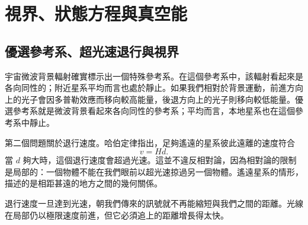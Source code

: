 \chapter{視界、狀態方程與真空能}

\section{優選參考系、超光速退行與視界}

宇宙微波背景輻射確實標示出一個特殊參考系。在這個參考系中，該輻射看起來是各向同性的；附近星系平均而言也處於靜止。如果我們相對於背景運動，前進方向上的光子會因多普勒效應而移向較高能量，後退方向上的光子則移向較低能量。優選參考系就是微波背景看起來各向同性的參考系；平均而言，本地星系也在這個參考系中靜止。

\begin{classroomqa}
\end{classroomqa}

第二個問題關於退行速度。哈伯定律指出，足夠遙遠的星系彼此遠離的速度符合
\begin{equation}
v = H d .
\end{equation}
當 \(d\) 夠大時，這個退行速度會超過光速。這並不違反相對論，因為相對論的限制是局部的：一個物體不能在我們眼前以超光速掠過另一個物體。遙遠星系的情形，描述的是相距甚遠的地方之間的幾何關係。

\begin{classroomqa}
\end{classroomqa}

退行速度一旦達到光速，朝我們傳來的訊號就不再能縮短與我們之間的距離。光線在局部仍以極限速度前進，但它必須追上的距離增長得太快。

\begin{classroomqa}
\end{classroomqa}

